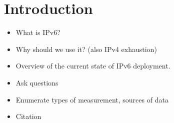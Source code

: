 \section{Introduction}

\begin{itemize}
    \item What is IPv6?
    \item Why should we use it? (also IPv4 exhaustion)
    \item Overview of the current state of IPv6 deployment.
    \item Ask questions
    \item Enumerate types of measurement, sources of data
    \item Citation\cite{rfc3177}
\end{itemize}
